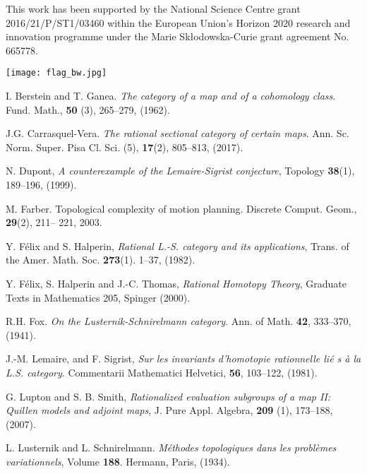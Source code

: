 This work has been supported by the National Science Centre grant \\ 2016/21/P/ST1/03460 within the European Union's Horizon 2020 research and innovation programme under the Marie Sk\l{}odowska-Curie grant agreement No. 665778.



\begin{flushright}
	\texttt{[image: flag\_bw.jpg]}\end{flushright}


\begin{thebibliography}{99}


 I. Berstein and T. Ganea. {\em The category of a map and of a cohomology class}. Fund. Math., {\bf 50} (3), 265--279, (1962). 

 J.G. Carrasquel-Vera. {\em The rational sectional category of certain maps}. Ann. Sc. Norm. Super.
Pisa Cl. Sci. (5), {\bf 17}(2), 805--813, (2017). 

 N. Dupont, {\em A counterexample of the Lemaire-Sigrist conjecture}, Topology {\bf 38}(1), 189--196, (1999).

 M. Farber. Topological complexity of motion planning. Discrete Comput. Geom., {\bf 29}(2), 211--
221, 2003.

 Y. F\'elix and S. Halperin, {\em Rational L.-S. category and its applications}, Trans. of the Amer. Math. Soc. {\bf 273}(1). 1--37, (1982).



 Y. F\'elix, S. Halperin and J.-C. Thomas, {\em Rational
    Homotopy Theory}, Graduate Texts in Mathematics 205, Spinger (2000).

 R.H. Fox. {\em On the Lusternik-Schnirelmann category}. Ann. of Math. {\bf 42}, 333--370, (1941). 

 J.-M. Lemaire,  and F. Sigrist, {\em Sur les invariants d'homotopie rationnelle li\'e s \`a la L.S. category}. Commentarii Mathematici Helvetici, {\bf 56}, 103--122, (1981).


 G. Lupton and S. B. Smith, {\em Rationalized evaluation subgroups of a map II: Quillen models and adjoint maps}, 
J. Pure Appl. Algebra, 
{\bf 209} (1), 173--188, (2007).

 L. Lusternik and L. Schnirelmann. {\em M\'ethodes topologiques dans les probl\`emes variationnels}, Volume {\bf 188}. Hermann, Paris, (1934).
  


\end{thebibliography}
